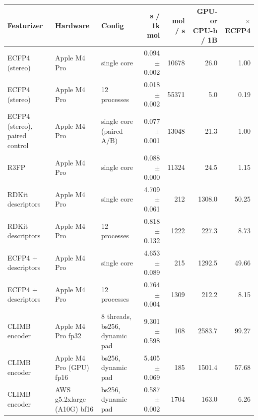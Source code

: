 \begin{tabular}{lllrrrr}
\hline
Featurizer & Hardware & Config & s / 1k mol & mol / s & GPU- or CPU-h / 1B & $\times$ ECFP4 \\
\hline
ECFP4 (stereo) & Apple M4 Pro & single core & 0.094 $\pm$ 0.002 & 10678 & 26.0 & 1.00 \\
ECFP4 (stereo) & Apple M4 Pro & 12 processes & 0.018 $\pm$ 0.002 & 55371 & 5.0 & 0.19 \\
ECFP4 (stereo), paired control & Apple M4 Pro & single core (paired A/B) & 0.077 $\pm$ 0.001 & 13048 & 21.3 & 1.00 \\
R3FP & Apple M4 Pro & single core & 0.088 $\pm$ 0.000 & 11324 & 24.5 & 1.15 \\
RDKit descriptors & Apple M4 Pro & single core & 4.709 $\pm$ 0.061 & 212 & 1308.0 & 50.25 \\
RDKit descriptors & Apple M4 Pro & 12 processes & 0.818 $\pm$ 0.132 & 1222 & 227.3 & 8.73 \\
ECFP4 + descriptors & Apple M4 Pro & single core & 4.653 $\pm$ 0.089 & 215 & 1292.5 & 49.66 \\
ECFP4 + descriptors & Apple M4 Pro & 12 processes & 0.764 $\pm$ 0.004 & 1309 & 212.2 & 8.15 \\
CLIMB encoder & Apple M4 Pro fp32 & 8 threads, bs256, dynamic pad & 9.301 $\pm$ 0.598 & 108 & 2583.7 & 99.27 \\
CLIMB encoder & Apple M4 Pro (GPU) fp16 & bs256, dynamic pad & 5.405 $\pm$ 0.069 & 185 & 1501.4 & 57.68 \\
CLIMB encoder & AWS g5.2xlarge (A10G) bf16 & bs256, dynamic pad & 0.587 $\pm$ 0.002 & 1704 & 163.0 & 6.26 \\
\hline
\end{tabular}
